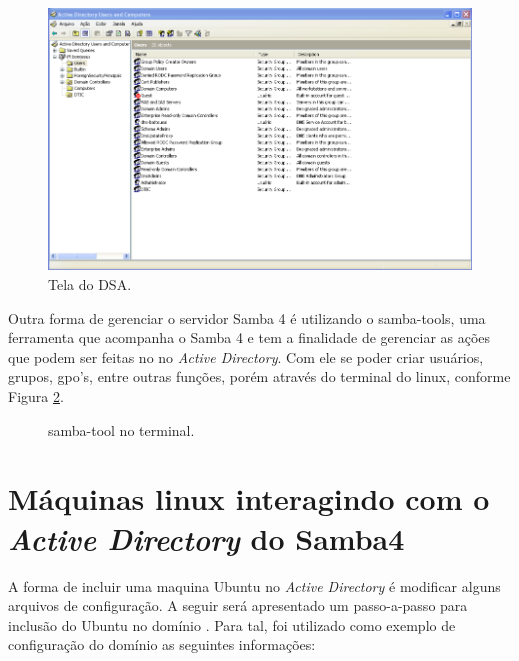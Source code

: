 
\begin{figure}[h!]
   	\centering
    \includegraphics[width=0.7 \textwidth]{figuras/addsa}
   	\caption{Tela do DSA.}
    \label{tela_dsa}
\end{figure}

Outra forma de gerenciar o servidor Samba 4 é utilizando o samba-tools, uma ferramenta que acompanha o Samba 4 e tem a finalidade de gerenciar as ações que podem ser feitas no no \textit{Active Directory}. Com ele se poder criar usuários, grupos, gpo's, entre outras funções, porém através do terminal do linux, conforme Figura \ref{samba-tool}.

\begin{figure}[ht]
   	\centering
   	\caption{samba-tool no terminal.}
    \label{samba-tool}
\end{figure}

\section{Máquinas linux interagindo com o \textit{Active Directory} do  Samba4}

A forma de incluir uma maquina Ubuntu no \textit{Active Directory} é modificar alguns arquivos de configuração. A seguir será apresentado um passo-a-passo para inclusão do Ubuntu no domínio \cite{UBUNTU-WIKI}. Para tal, foi utilizado como exemplo de configuração do domínio as seguintes informações:

